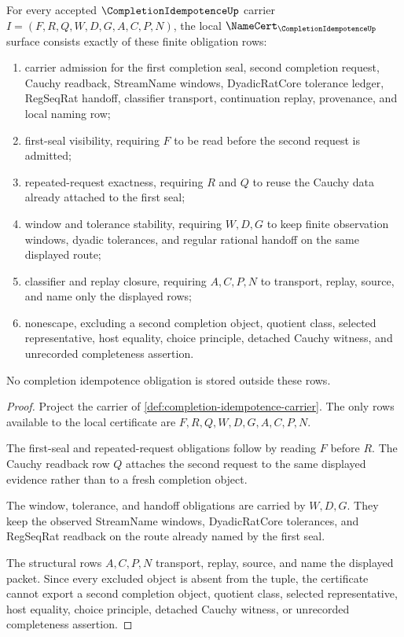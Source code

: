 \begin{theorem}
\label{thm:completion-idempotence-namecert-obligations}
For every accepted $\CompletionIdempotenceUp$ carrier $I=(F,R,Q,W,D,G,A,C,P,N)$, the local $\NameCert_{\CompletionIdempotenceUp}$ surface consists exactly of these finite obligation rows:
\begin{enumerate}
\item carrier admission for the first completion seal, second completion request, Cauchy readback, StreamName windows, DyadicRatCore tolerance ledger, RegSeqRat handoff, classifier transport, continuation replay, provenance, and local naming row;
\item first-seal visibility, requiring $F$ to be read before the second request is admitted;
\item repeated-request exactness, requiring $R$ and $Q$ to reuse the Cauchy data already attached to the first seal;
\item window and tolerance stability, requiring $W,D,G$ to keep finite observation windows, dyadic tolerances, and regular rational handoff on the same displayed route;
\item classifier and replay closure, requiring $A,C,P,N$ to transport, replay, source, and name only the displayed rows;
\item nonescape, excluding a second completion object, quotient class, selected representative, host equality, choice principle, detached Cauchy witness, and unrecorded completeness assertion.
\end{enumerate}
No completion idempotence obligation is stored outside these rows.
\end{theorem}
\begin{proof}
Project the carrier of \autoref{def:completion-idempotence-carrier}. The only rows available to the local certificate are $F,R,Q,W,D,G,A,C,P,N$.

The first-seal and repeated-request obligations follow by reading $F$ before $R$. The Cauchy readback row $Q$ attaches the second request to the same displayed evidence rather than to a fresh completion object.

The window, tolerance, and handoff obligations are carried by $W,D,G$. They keep the observed StreamName windows, DyadicRatCore tolerances, and RegSeqRat readback on the route already named by the first seal.

The structural rows $A,C,P,N$ transport, replay, source, and name the displayed packet. Since every excluded object is absent from the tuple, the certificate cannot export a second completion object, quotient class, selected representative, host equality, choice principle, detached Cauchy witness, or unrecorded completeness assertion.
\end{proof}


